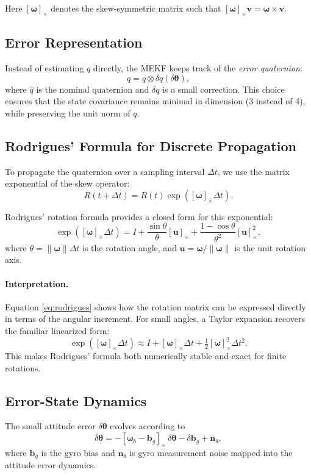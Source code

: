\documentclass[11pt]{article}
\begin{document}
Here $[\bm\omega]_\times$ denotes the skew-symmetric matrix such that $[\bm\omega]_\times \bm v = \bm\omega \times \bm v$.

\subsection{Error Representation}
Instead of estimating $q$ directly, the MEKF keeps track of the \emph{error quaternion}:
\begin{equation}
q = \hat q \otimes \delta q(\delta\bm\theta),
\end{equation}
where $\hat q$ is the nominal quaternion and $\delta q$ is a small correction. 
This choice ensures that the state covariance remains minimal in dimension (3 instead of 4), 
while preserving the unit norm of $q$.

\subsection{Rodrigues' Formula for Discrete Propagation}
To propagate the quaternion over a sampling interval $\Delta t$, 
we use the matrix exponential of the skew operator:
\begin{equation}
R(t+\Delta t) = R(t) \exp\!\left([\bm\omega]_\times \Delta t\right).
\label{eq:rot_exp}
\end{equation}

Rodrigues' rotation formula provides a closed form for this exponential:
\begin{equation}
\exp([\bm\omega]_\times \Delta t) = I 
+ \frac{\sin \theta}{\theta} [\bm u]_\times
+ \frac{1 - \cos \theta}{\theta^2} [\bm u]_\times^2,
\label{eq:rodrigues}
\end{equation}
where $\theta = \|\bm\omega\| \Delta t$ is the rotation angle, 
and $\bm u = \bm\omega / \|\bm\omega\|$ is the unit rotation axis.

\paragraph{Interpretation.}
Equation \eqref{eq:rodrigues} shows how the rotation matrix can be expressed 
directly in terms of the angular increment. 
For small angles, a Taylor expansion recovers the familiar linearized form:
\[
\exp([\bm\omega]_\times \Delta t) \approx I + [\bm\omega]_\times \Delta t + \tfrac{1}{2} [\bm\omega]_\times^2 \Delta t^2.
\]
This makes Rodrigues' formula both numerically stable and exact for finite rotations.

\subsection{Error-State Dynamics}
The small attitude error $\delta\bm\theta$ evolves according to
\begin{equation}
\dot{\delta\bm\theta} = -[\bm\omega_b - \bm b_g]_\times \, \delta\bm\theta - \delta\bm b_g + \bm n_\theta,
\label{eq:att_err_dyn}
\end{equation}
where $\bm b_g$ is the gyro bias and $\bm n_\theta$ is gyro measurement noise mapped into the attitude error dynamics.
\end{document}

